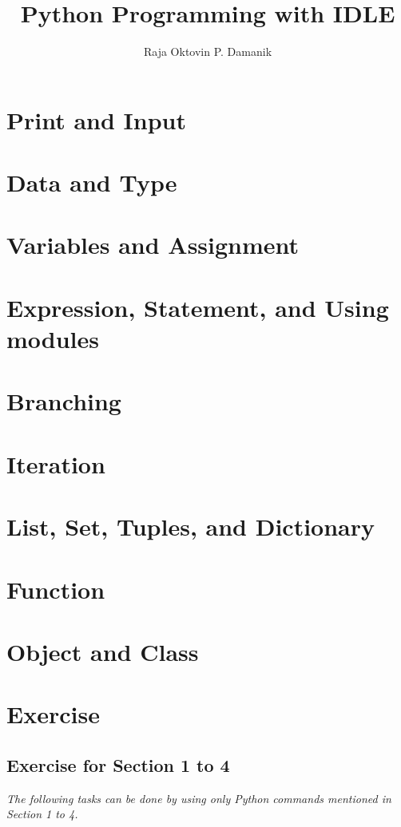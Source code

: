 \documentclass[14pt]{extarticle}
\title{Python Programming with IDLE}
\author{Raja Oktovin P. Damanik}
\begin{document}
\maketitle

\section{Print and Input}

\section{Data and Type}

\section{Variables and Assignment}

\section{Expression, Statement, and Using modules}

\section{Branching}

\section{Iteration}

\section{List, Set, Tuples, and Dictionary}

\section{Function}

\section{Object and Class}

\section{Exercise}

\subsection{Exercise for Section 1 to 4}
\emph{The following tasks can be done by using only Python commands mentioned in Section 1 to 4.}
\end{document}
